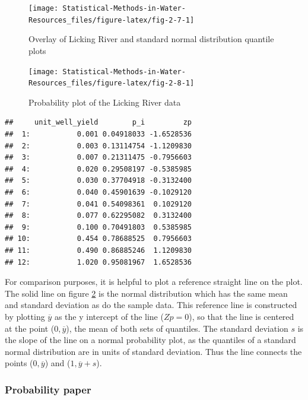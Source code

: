 \documentclass[]{book}
\begin{document}
\begin{figure}

{\centering \texttt{[image: Statistical-Methods-in-Water-Resources\_files/figure-latex/fig-2-7-1]} 

}

\caption{Overlay of Licking River and standard normal distribution quantile plots}\label{fig:fig-2-7}
\end{figure}
\begin{figure}

{\centering \texttt{[image: Statistical-Methods-in-Water-Resources\_files/figure-latex/fig-2-8-1]} 

}

\caption{Probability plot of the Licking River data}\label{fig:fig-2-8}
\end{figure}

\begin{verbatim}
##     unit_well_yield        p_i         zp
##  1:           0.001 0.04918033 -1.6528536
##  2:           0.003 0.13114754 -1.1209830
##  3:           0.007 0.21311475 -0.7956603
##  4:           0.020 0.29508197 -0.5385985
##  5:           0.030 0.37704918 -0.3132400
##  6:           0.040 0.45901639 -0.1029120
##  7:           0.041 0.54098361  0.1029120
##  8:           0.077 0.62295082  0.3132400
##  9:           0.100 0.70491803  0.5385985
## 10:           0.454 0.78688525  0.7956603
## 11:           0.490 0.86885246  1.1209830
## 12:           1.020 0.95081967  1.6528536
\end{verbatim}

For comparison purposes, it is helpful to plot a reference straight line on the plot. The solid line on figure \ref{fig:fig-2-8} is the normal distribution which has the same mean and standard deviation as do the sample data. This reference line is constructed by plotting \(\overline{y}\) as the y intercept of the line (\(Zp = 0\)), so that the line is centered at the point (\(0, \overline{y}\)), the mean of both sets of quantiles. The standard deviation \(s\) is the slope of the line on a normal probability plot, as the quantiles of a standard normal distribution are in units of standard deviation. Thus the line connects the points (\(0, \overline{y}\)) and (\(1 , \overline{y} + s\)).

\hypertarget{probability-paper}{%
\subsubsection{Probability paper}\label{probability-paper}}
\end{document}
